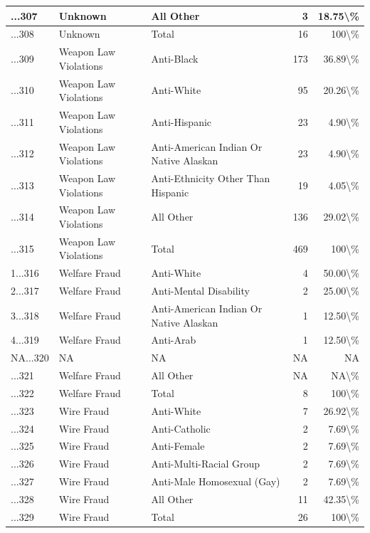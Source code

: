 \documentclass[
]{krantz}
\begin{document}
\begin{longtable}[t]{l|l|l|r|r}
\hline
...307 & Unknown & All Other & 3 & 18.75\textbackslash{}\%\\
\hline
...308 & Unknown & Total & 16 & 100\textbackslash{}\%\\
\hline
...309 & Weapon Law Violations & Anti-Black & 173 & 36.89\textbackslash{}\%\\
\hline
...310 & Weapon Law Violations & Anti-White & 95 & 20.26\textbackslash{}\%\\
\hline
...311 & Weapon Law Violations & Anti-Hispanic & 23 & 4.90\textbackslash{}\%\\
\hline
...312 & Weapon Law Violations & Anti-American Indian Or Native Alaskan & 23 & 4.90\textbackslash{}\%\\
\hline
...313 & Weapon Law Violations & Anti-Ethnicity Other Than Hispanic & 19 & 4.05\textbackslash{}\%\\
\hline
...314 & Weapon Law Violations & All Other & 136 & 29.02\textbackslash{}\%\\
\hline
...315 & Weapon Law Violations & Total & 469 & 100\textbackslash{}\%\\
\hline
1...316 & Welfare Fraud & Anti-White & 4 & 50.00\textbackslash{}\%\\
\hline
2...317 & Welfare Fraud & Anti-Mental Disability & 2 & 25.00\textbackslash{}\%\\
\hline
3...318 & Welfare Fraud & Anti-American Indian Or Native Alaskan & 1 & 12.50\textbackslash{}\%\\
\hline
4...319 & Welfare Fraud & Anti-Arab & 1 & 12.50\textbackslash{}\%\\
\hline
NA...320 & NA & NA & NA & NA\\
\hline
...321 & Welfare Fraud & All Other & NA & NA\textbackslash{}\%\\
\hline
...322 & Welfare Fraud & Total & 8 & 100\textbackslash{}\%\\
\hline
...323 & Wire Fraud & Anti-White & 7 & 26.92\textbackslash{}\%\\
\hline
...324 & Wire Fraud & Anti-Catholic & 2 & 7.69\textbackslash{}\%\\
\hline
...325 & Wire Fraud & Anti-Female & 2 & 7.69\textbackslash{}\%\\
\hline
...326 & Wire Fraud & Anti-Multi-Racial Group & 2 & 7.69\textbackslash{}\%\\
\hline
...327 & Wire Fraud & Anti-Male Homosexual (Gay) & 2 & 7.69\textbackslash{}\%\\
\hline
...328 & Wire Fraud & All Other & 11 & 42.35\textbackslash{}\%\\
\hline
...329 & Wire Fraud & Total & 26 & 100\textbackslash{}\%\\
\hline
\end{longtable}
\end{document}
